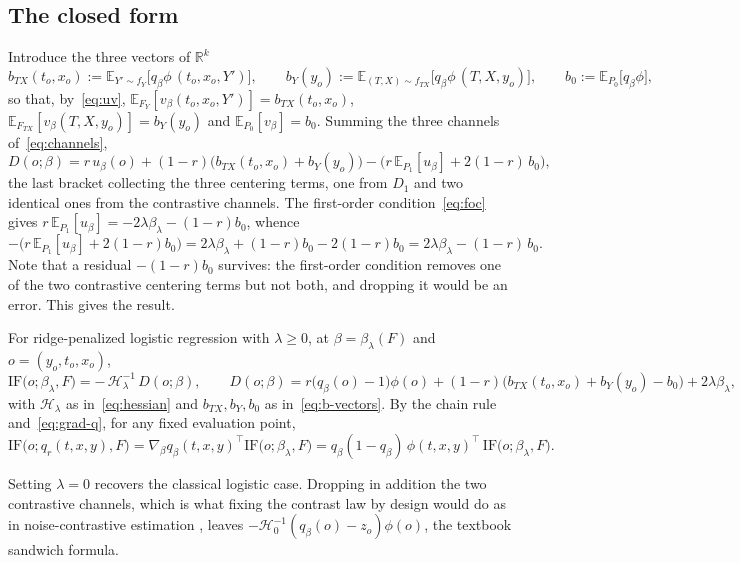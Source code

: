 \documentclass[11pt]{article}
\newcommand{\Eb}{\mathbb{E}}
\newcommand{\IF}{\mathrm{IF}}
\newcommand{\Hb}{\mathcal{H}}
\begin{document}
\subsection{The closed form}
\label{sec:closed-form}

Introduce the three vectors of $\mathbb{R}^k$
\begin{equation}
b_{TX}(t_o,x_o) := \Eb_{Y'\sim f_Y}\big[q_\beta\phi\,(t_o,x_o,Y')\big],
\qquad
b_{Y}(y_o) := \Eb_{(T,X)\sim f_{TX}}\big[q_\beta\phi\,(T,X,y_o)\big],
\qquad
b_0 := \Eb_{P_0}\big[q_\beta\phi\big],
\label{eq:b-vectors}
\end{equation}
so that, by~\eqref{eq:uv}, $\Eb_{F_Y}[v_\beta(t_o,x_o,Y')]=b_{TX}(t_o,x_o)$,
$\Eb_{F_{TX}}[v_\beta(T,X,y_o)]=b_Y(y_o)$ and $\Eb_{P_0}[v_\beta]=b_0$. Summing the
three channels of~\eqref{eq:channels},
\[
D(o;\beta) = r\,u_\beta(o) + (1-r)\big(b_{TX}(t_o,x_o)+b_Y(y_o)\big)
- \Big(r\,\Eb_{P_1}[u_\beta] + 2(1-r)\,b_0\Big),
\]
the last bracket collecting the three centering terms, one from $D_1$ and two
identical ones from the contrastive channels. The first-order condition~\eqref{eq:foc}
gives $r\,\Eb_{P_1}[u_\beta] = -2\lambda\beta_\lambda-(1-r)b_0$, whence
\[
-\Big(r\,\Eb_{P_1}[u_\beta]+2(1-r)b_0\Big)
= 2\lambda\beta_\lambda+(1-r)b_0-2(1-r)b_0
= 2\lambda\beta_\lambda-(1-r)\,b_0 .
\]
Note that a residual $-(1-r)b_0$ survives: the first-order condition removes one of
the two contrastive centering terms but not both, and dropping it would be an error.
This gives the result.

\begin{keyresult}
For ridge-penalized logistic regression with $\lambda\ge0$, at
$\beta=\beta_\lambda(F)$ and $o=(y_o,t_o,x_o)$,
\begin{equation}
\IF\big(o;\beta_\lambda,F\big)
= -\,\Hb_\lambda^{-1}\,D(o;\beta),
\qquad
D(o;\beta) = r\big(q_\beta(o)-1\big)\phi(o)
+ (1-r)\Big(b_{TX}(t_o,x_o)+b_Y(y_o)-b_0\Big)
+ 2\lambda\beta_\lambda,
\label{eq:if-beta}
\end{equation}
with $\Hb_\lambda$ as in~\eqref{eq:hessian} and $b_{TX},b_Y,b_0$ as
in~\eqref{eq:b-vectors}. By the chain rule and~\eqref{eq:grad-q}, for any fixed
evaluation point,
\begin{equation}
\IF\big(o;q_r(t,x,y),F\big)
= \nabla_\beta q_\beta(t,x,y)^\top\IF\big(o;\beta_\lambda,F\big)
= q_\beta(1-q_\beta)\,\phi(t,x,y)^\top\,\IF\big(o;\beta_\lambda,F\big).
\label{eq:if-qr}
\end{equation}
\end{keyresult}

Setting $\lambda=0$ recovers the classical logistic case. Dropping in addition the two
contrastive channels, which is what fixing the contrast law by design would do as in
noise-contrastive estimation \citep{gutmann2010nce}, leaves
$-\Hb_0^{-1}(q_\beta(o)-z_o)\phi(o)$, the textbook sandwich formula.
\end{document}
